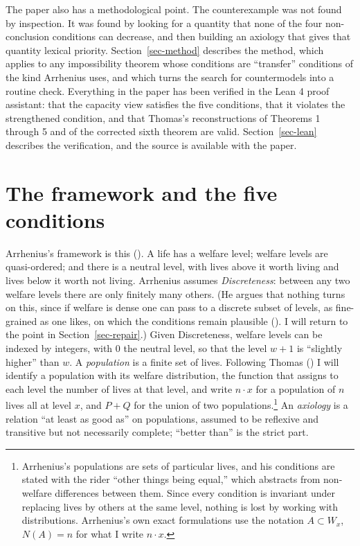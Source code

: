 \documentclass[
  11pt,
  letterpaper,
  DIV=11,
  numbers=noendperiod,
  twoside]{scrartcl}
\newcounter{none} %
\begin{document}
The paper also has a methodological point. The counterexample was not
found by inspection. It was found by looking for a quantity that none of
the four non-conclusion conditions can decrease, and then building an
axiology that gives that quantity lexical priority.
Section~\ref{sec-method} describes the method, which applies to any
impossibility theorem whose conditions are ``transfer'' conditions of
the kind Arrhenius uses, and which turns the search for countermodels
into a routine check. Everything in the paper has been verified in the
Lean 4 proof assistant: that the capacity view satisfies the five
conditions, that it violates the strengthened condition, and that
Thomas's reconstructions of Theorems 1 through 5 and of the corrected
sixth theorem are valid. Section~\ref{sec-lean} describes the
verification, and the source is available with the paper.

\section{The framework and the five conditions}\label{sec-conditions}

Arrhenius's framework is this (). A life has a welfare level; welfare levels are
quasi-ordered; and there is a neutral level, with lives above it worth
living and lives below it worth not living. Arrhenius assumes
\emph{Discreteness}: between any two welfare levels there are only
finitely many others. (He argues that nothing turns on this, since if
welfare is dense one can pass to a discrete subset of levels, as
fine-grained as one likes, on which the conditions remain plausible
(). I will return to the
point in Section~\ref{sec-repair}.) Given Discreteness, welfare levels
can be indexed by integers, with 0 the neutral level, so that the level
\(w+1\) is ``slightly higher'' than \(w\). A \emph{population} is a
finite set of lives. Following Thomas ()
I will identify a population with its welfare distribution, the function
that assigns to each level the number of lives at that level, and write
\(n \cdot x\) for a population of \(n\) lives all at level \(x\), and
\(P + Q\) for the union of two populations.\footnote{Arrhenius's
  populations are sets of particular lives, and his conditions are
  stated with the rider ``other things being equal,'' which abstracts
  from non-welfare differences between them. Since every condition is
  invariant under replacing lives by others at the same level, nothing
  is lost by working with distributions. Arrhenius's own exact
  formulations use the notation \(A \subset W_x\), \(N(A) = n\) for what
  I write \(n \cdot x\).} An \emph{axiology} is a relation ``at least as
good as'' on populations, assumed to be reflexive and transitive but not
necessarily complete; ``better than'' is the strict part.
\end{document}
